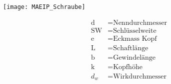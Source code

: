 \begin{scriptsize}
    \begin{minipage}{0.6\linewidth}
        \begin{center}
            \texttt{[image: MAEIP\_Schraube]}
        \end{center}
    \end{minipage}
    \begin{minipage}{0.38\linewidth}
        \begin{center}
            \begin{align*}
            \text{d} &= \text{Nenndurchmesser}
            \\\text{SW} &= \text{Schlüsselweite}
            \\\text{e} &= \text{Eckmass Kopf}
            \\\text{L} &= \text{Schaftlänge}
            \\\text{b} &= \text{Gewindelänge}
            \\\text{k} &= \text{Kopfhöhe}
            \\d_w &= \text{Wirkdurchmesser}
            \end{align*}
        \end{center}
    \end{minipage}
\end{scriptsize}